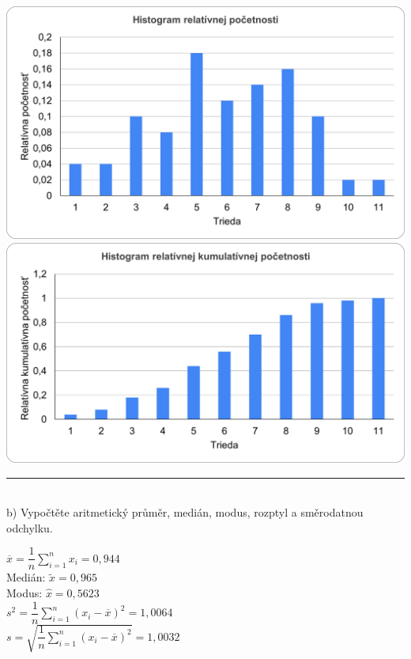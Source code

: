 \documentclass[pdftex, 11pt, a4paper, titlepage]{article}
\begin{document}
    \begin{center}
        \noindent
        \includegraphics[scale=0.8]{histogram_relat_pocetnost.png}\\\vspace{5pt}
        \includegraphics[scale=0.8]{histogram_relat_kumul_pocetnost.png}
    \end{center}

    \noindent\rule{\linewidth}{0.4pt}\\

    \noindent
    b) Vypočtěte aritmetický průměr, medián, modus, rozptyl a směrodatnou
    odchylku.

    \noindent
    $ \overline{x} = \dfrac{1}{n} \sum\limits_{i=1}^{n} x_i = 0,944 $ \\
    Medián: $ \tilde{x} = 0,965 $ \\
    Modus: $ \hat{x} = 0,5623 $ \\
    $ s^2 = \dfrac{1}{n} \sum\limits_{i=1}^{n} (x_i - \overline{x})^2 = 1,0064 $ \\
    $ s = \sqrt{\dfrac{1}{n} \sum\limits_{i=1}^{n} (x_i - \overline{x})^2} = 1,0032 $ \\
\end{document}
